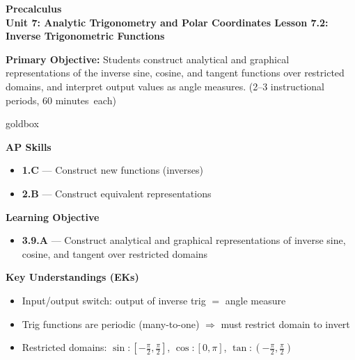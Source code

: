\documentclass[10pt]{article}
\newcommand{\CourseName}{Precalculus}
\newcommand{\MeetingLength}{60 minutes}
\newcommand{\UnitNumberName}{Unit 7: Analytic Trigonometry and Polar Coordinates \quad}
\newcommand{\LessonNumberName}{Lesson 7.2: Inverse Trigonometric Functions}
\begin{document}
\begin{center}
    {\Large\bfseries \CourseName \\
    {\small\bfseries \UnitNumberName \LessonNumberName}}
\end{center}

\begin{tcolorbox}[colback=sky, colframe=navy, boxrule=0.9pt, arc=2mm,
    left=2mm, right=2mm, top=1.5mm, bottom=1.5mm]
    \textbf{Primary Objective:} Students construct analytical and graphical
    representations of the inverse sine, cosine, and tangent functions over
    restricted domains, and interpret output values as angle measures.
    (2--3 instructional periods, \MeetingLength\ each)
\end{tcolorbox}

\renewcommand{\arraystretch}{1.6}
\begin{skillbox}{goldbox}
\begin{minipage}[t]{0.54\linewidth}\vspace{0pt}
    \textbf{AP Skills}
    \begin{itemize}[leftmargin=1.4em, itemsep=2pt]
        \item \textbf{1.C} --- Construct new functions (inverses)
        \item \textbf{2.B} --- Construct equivalent representations
    \end{itemize}
    \textbf{Learning Objective}
    \begin{itemize}[leftmargin=1.4em, itemsep=2pt]
        \item \textbf{3.9.A} --- Construct analytical and graphical
              representations of inverse sine, cosine, and tangent over
              restricted domains
    \end{itemize}
\end{minipage}\hfill
\begin{minipage}[t]{0.42\linewidth}\vspace{0pt}
    \textbf{Key Understandings (EKs)}
    \begin{itemize}[leftmargin=1.4em, itemsep=2pt]
        \item Input/output switch: output of inverse trig $=$ angle measure
        \item Trig functions are periodic (many-to-one) $\Rightarrow$ must
              restrict domain to invert
        \item Restricted domains: $\sin\colon[-\tfrac{\pi}{2},\tfrac{\pi}{2}]$,
              $\cos\colon[0,\pi]$, $\tan\colon(-\tfrac{\pi}{2},\tfrac{\pi}{2})$
    \end{itemize}
\end{minipage}
\end{skillbox}
\end{document}
